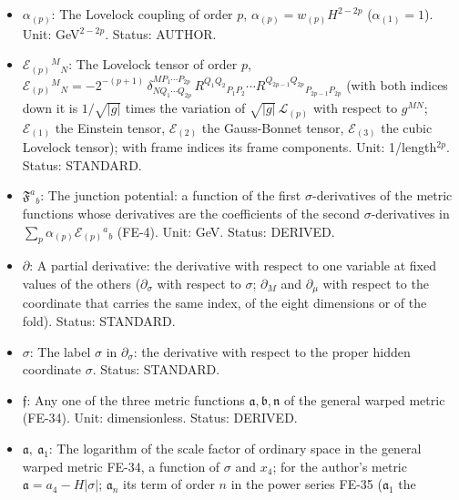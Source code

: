 \documentclass[
  10pt,
]{article}
\begin{document}
\begin{itemize}
  \(p\): The Lovelock order \(p = 1, 2, 3\) (Einstein, Gauss-Bonnet,
  cubic), as an index and as a number; in the Kohn-Sham equations also a
  second label of a Kohn-Sham orbital, with the Kronecker delta of the
  two labels. Status: STANDARD.
\item
  \(\alpha_{(p)}\): The Lovelock coupling of order \(p\),
  \(\alpha_{(p)} = w_{(p)}H^{2-2p}\) (\(\alpha_{(1)} = 1\)). Unit:
  GeV\(^{2-2p}\). Status: AUTHOR.
\item
  \(\mathcal{E}_{(p)}{}^M{}_N\): The Lovelock tensor of order \(p\),
  \(\mathcal{E}_{(p)}{}^M{}_N = -2^{-(p+1)}\,\delta^{MP_1\cdots P_{2p}}_{NQ_1\cdots Q_{2p}}\,R^{Q_1Q_2}{}_{P_1P_2}\cdots R^{Q_{2p-1}Q_{2p}}{}_{P_{2p-1}P_{2p}}\)
  (with both indices down it is \(1/\sqrt{\lvert g\rvert}\) times the
  variation of \(\sqrt{\lvert g\rvert}\,\mathcal{L}_{(p)}\) with respect
  to \(g^{MN}\); \(\mathcal{E}_{(1)}\) the Einstein tensor,
  \(\mathcal{E}_{(2)}\) the Gauss-Bonnet tensor, \(\mathcal{E}_{(3)}\)
  the cubic Lovelock tensor); with frame indices its frame components.
  Unit: 1/length\(^{2p}\). Status: STANDARD.
\item
  \(\mathfrak{F}^a{}_b\): The junction potential: a function of the
  first \(\sigma\)-derivatives of the metric functions whose derivatives
  are the coefficients of the second \(\sigma\)-derivatives in
  \(\sum_p\alpha_{(p)}\mathcal{E}_{(p)}{}^a{}_b\) (FE-4). Unit: GeV.
  Status: DERIVED.
\item
  \(\partial\): A partial derivative: the derivative with respect to one
  variable at fixed values of the others (\(\partial_\sigma\) with
  respect to \(\sigma\); \(\partial_M\) and \(\partial_\mu\) with
  respect to the coordinate that carries the same index, of the eight
  dimensions or of the fold). Status: STANDARD.
\item
  \(\sigma\): The label \(\sigma\) in \(\partial_\sigma\): the
  derivative with respect to the proper hidden coordinate \(\sigma\).
  Status: STANDARD.
\item
  \(\mathfrak{f}\): Any one of the three metric functions
  \(\mathfrak{a}, \mathfrak{b}, \mathfrak{n}\) of the general warped
  metric (FE-34). Unit: dimensionless. Status: DERIVED.
\item
  \(\mathfrak{a},\ \mathfrak{a}_1\): The logarithm of the scale factor
  of ordinary space in the general warped metric FE-34, a function of
  \(\sigma\) and \(x_4\); for the author's metric
  \(\mathfrak{a} = a_4 - H\lvert\sigma\rvert\); \(\mathfrak{a}_n\) its
  term of order \(n\) in the power series FE-35 (\(\mathfrak{a}_1\) the

\end{itemize}
\end{document}
